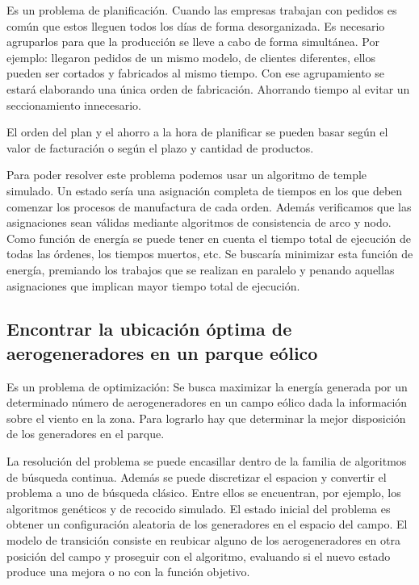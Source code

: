 \documentclass[
]{article}
\begin{document}
Es un problema de planificación. Cuando las empresas trabajan con
pedidos es común que estos lleguen todos los días de forma
desorganizada. Es necesario agruparlos para que la producción se lleve a
cabo de forma simultánea. Por ejemplo: llegaron pedidos de un mismo
modelo, de clientes diferentes, ellos pueden ser cortados y fabricados
al mismo tiempo. Con ese agrupamiento se estará elaborando una única
orden de fabricación. Ahorrando tiempo al evitar un seccionamiento
innecesario.

El orden del plan y el ahorro a la hora de planificar se pueden basar
según el valor de facturación o según el plazo y cantidad de productos.

Para poder resolver este problema podemos usar un algoritmo de temple
simulado. Un estado sería una asignación completa de tiempos en los que
deben comenzar los procesos de manufactura de cada orden. Además
verificamos que las asignaciones sean válidas mediante algoritmos de
consistencia de arco y nodo. Como función de energía se puede tener en
cuenta el tiempo total de ejecución de todas las órdenes, los tiempos
muertos, etc. Se buscaría minimizar esta función de energía, premiando
los trabajos que se realizan en paralelo y penando aquellas asignaciones
que implican mayor tiempo total de ejecución.

\hypertarget{encontrar-la-ubicaciuxf3n-uxf3ptima-de-aerogeneradores-en-un-parque-euxf3lico}{%
\subsection{Encontrar la ubicación óptima de aerogeneradores en un
parque
eólico}\label{encontrar-la-ubicaciuxf3n-uxf3ptima-de-aerogeneradores-en-un-parque-euxf3lico}}

Es un problema de optimización: Se busca maximizar la energía generada
por un determinado número de aerogeneradores en un campo eólico dada la
información sobre el viento en la zona. Para lograrlo hay que determinar
la mejor disposición de los generadores en el parque.

La resolución del problema se puede encasillar dentro de la familia de
algoritmos de búsqueda continua. Además se puede discretizar el espacion
y convertir el problema a uno de búsqueda clásico. Entre ellos se
encuentran, por ejemplo, los algoritmos genéticos y de recocido
simulado. El estado inicial del problema es obtener un configuración
aleatoria de los generadores en el espacio del campo. El modelo de
transición consiste en reubicar alguno de los aerogeneradores en otra
posición del campo y proseguir con el algoritmo, evaluando si el nuevo
estado produce una mejora o no con la función objetivo.
\end{document}
